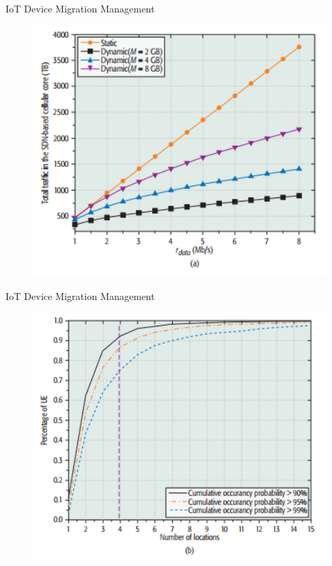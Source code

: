 \documentclass{beamer}
\begin{document}
\begin{frame} {{IoT} Device Migration Management} 
    \begin{figure}[t]
        \centering
        \includegraphics[width=1.0\textwidth]{figures/6.png}
        
    \end{figure}
\end{frame}

\begin{frame} {{IoT} Device Migration Management} 
    \begin{figure}[t]
        \centering
        \includegraphics[width=1.0\textwidth]{figures/7.png}
        
    \end{figure}
\end{frame}
\end{document}
